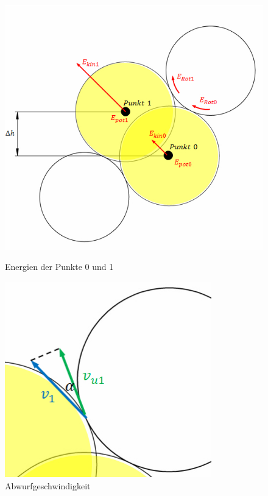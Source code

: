 \begin{figure}[h!]
    \begin{minipage}[hbt]{0.6\textwidth}
    	\centering
    	\includegraphics[width=1\textwidth]{Enddokumentation/Anhang/Bilder/Energien.jpg}
    	\caption{Energien der Punkte 0 und 1}
    	\label{fig:Energien}
    \end{minipage}
\hfill
    \begin{minipage}[hbt]{0.4\textwidth}
    	\centering
    	\includegraphics[width=0.8\textwidth,clip,trim=0cm 0cm 2cm 0cm]
    	{Enddokumentation/Anhang/Bilder/Abwurfgeschwindigkeit.jpg}
    	\caption{Abwurfgeschwindigkeit}
    	\label{fig:Abwurfgeschwindigkeit}
    \end{minipage}
\end{figure}

